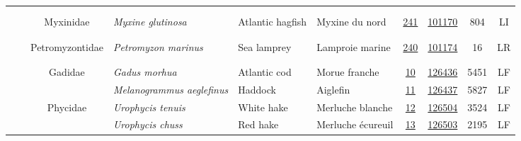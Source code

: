 \documentclass[12pt]{article}\usepackage[]{graphicx}\usepackage[]{color}
\begin{document}
\begin{landscapepage}
\begin{longtable}[t]{ccc>{\centering\arraybackslash}p{3cm}>{\centering\arraybackslash}p{3cm}>{\centering\arraybackslash}p{3cm}>{}c>{}ccc}
\endfoot
\bottomrule
\endlastfoot
\addlinespace[0.3em]
\\
\addlinespace[0.3em]
\\
\hspace{1em}\hspace{1em} &  & Myxinidae & \em{Myxine glutinosa} & Atlantic hagfish & Myxine du nord & \href{#sec:241}{241} & \href{http://www.marinespecies.org/aphia.php?p=taxdetails&id=101170}{101170} & 804 & LI\\
\pagebreak[0]
\addlinespace[0.3em]
\\
\addlinespace[0.3em]
\\
\hspace{1em}\hspace{1em} &  & Petromyzontidae & \em{Petromyzon marinus} & Sea lamprey & Lamproie marine & \href{#sec:240}{240} & \href{http://www.marinespecies.org/aphia.php?p=taxdetails&id=101174}{101174} & 16 & LR\\
\pagebreak[0]
\addlinespace[0.3em]
\\
\addlinespace[0.3em]
\\
\hspace{1em}\hspace{1em} &  & Gadidae & \em{Gadus morhua} & Atlantic cod & Morue franche & \href{#sec:10}{10} & \href{http://www.marinespecies.org/aphia.php?p=taxdetails&id=126436}{126436} & 5451 & LF\\
\nopagebreak
\hspace{1em}\hspace{1em} &  &  & \em{Melanogrammus aeglefinus} & Haddock & Aiglefin & \href{#sec:11}{11} & \href{http://www.marinespecies.org/aphia.php?p=taxdetails&id=126437}{126437} & 5827 & LF\\
\nopagebreak
\hspace{1em}\hspace{1em} &  & Phycidae & \em{Urophycis tenuis} & White hake & Merluche blanche & \href{#sec:12}{12} & \href{http://www.marinespecies.org/aphia.php?p=taxdetails&id=126504}{126504} & 3524 & LF\\
\nopagebreak
\hspace{1em}\hspace{1em} &  &  & \em{Urophycis chuss} & Red hake & Merluche écureuil & \href{#sec:13}{13} & \href{http://www.marinespecies.org/aphia.php?p=taxdetails&id=126503}{126503} & 2195 & LF\\

\end{longtable}
\end{landscapepage}
\end{document}
